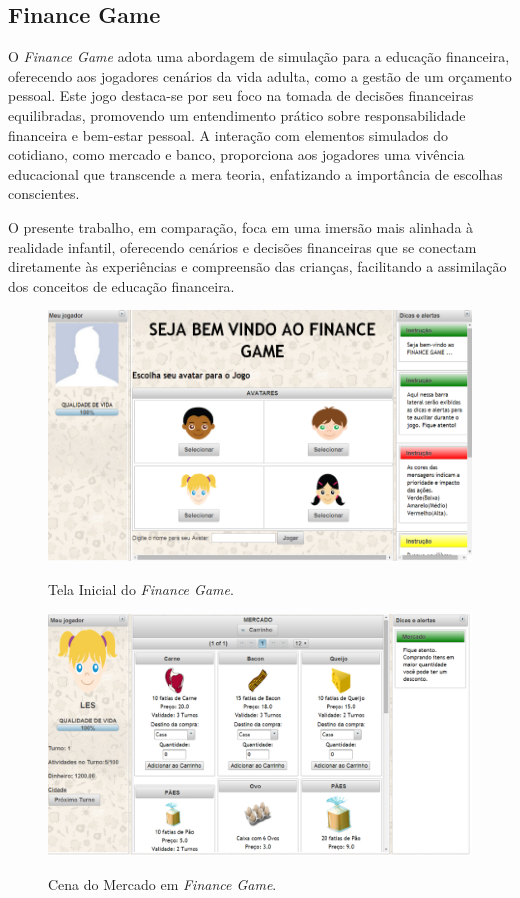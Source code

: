 \newpage

\subsection{Finance Game}
O \textit{Finance Game} \cite{Finance_Game} adota uma abordagem de simulação para a educação financeira, oferecendo aos jogadores cenários da vida adulta, como a gestão de um orçamento pessoal. Este jogo destaca-se por seu foco na tomada de decisões financeiras equilibradas, promovendo um entendimento prático sobre responsabilidade financeira e bem-estar pessoal. A interação com elementos simulados do cotidiano, como mercado e banco, proporciona aos jogadores uma vivência educacional que transcende a mera teoria, enfatizando a importância de escolhas conscientes.

O presente trabalho, em comparação, foca em uma imersão mais alinhada à realidade infantil, oferecendo cenários e decisões financeiras que se conectam diretamente às experiências e compreensão das crianças, facilitando a assimilação dos conceitos de educação financeira.

\begin{figure}[ht]
	\centering
	\caption{Tela Inicial do \textit{Finance Game}.}
	\includegraphics[scale=0.6]{Textuais/Pictures/Finance-game-1.png}
	\label{fig:finance-game-1}
\end{figure}

\begin{figure}[ht]
	\centering
	\caption{Cena do Mercado em \textit{Finance Game}.}
	\includegraphics[scale=0.4]{Textuais/Pictures/Finance-game-2.png}
	\label{fig:finance-game-2}
\end{figure}

